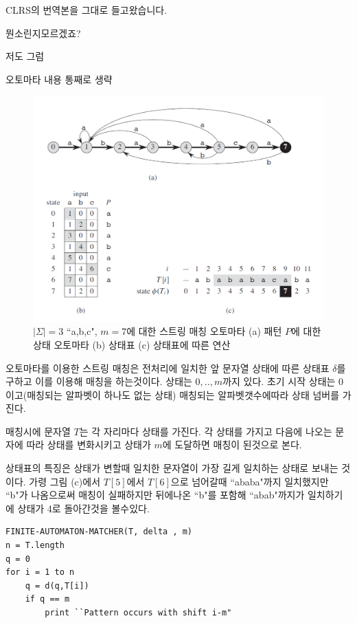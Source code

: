 CLRS의 번역본을 그대로 들고왔습니다.


뭔소린지모르겠죠?

저도 그럼

오토마타 내용 통째로 생략

\newpage



\begin{figure}[h!]
    \centering
    \includegraphics[scale=0.4]{pic2.PNG}
    \caption{$|\Sigma|  = 3$ ``a,b,c", $m = 7$에 대한 스트링 매칭 오토마타
    (a) 패턴 $P$에 대한 상태 오토마타 (b) 상태표 (c) 상태표에 따른 연산}
\end{figure}

오토마타를 이용한 스트링 매칭은 전처리에 일치한 앞 문자열 상태에 따른 상태표 $\delta$를 구하고 이를 이용해 매칭을 하는것이다.
상태는 $0,..,m$까지 있다. 초기 시작 상태는 0이고(매칭되는 알파벳이 하나도 없는 상태)
매칭되는 알파벳갯수에따라 상태 넘버를 가진다.

매칭시에 문자열 $T$는 각 자리마다 상태를 가진다. 각 상태를 가지고 다음에 나오는 문자에 따라 상태를 변화시키고 상태가 $m$에 도달하면 매칭이 된것으로 본다.

상태표의 특징은 상태가 변할때 일치한 문자열이 가장 길게 일치하는 상태로 보내는 것이다.
가령 그림 (c)에서 $T[5]$에서 $T[6]$으로 넘어갈때 ``ababa"까지 일치했지만 ``b"가 나옴으로써 매칭이 실패하지만 뒤에나온 ``b"를 포함해 ``abab"까지가 일치하기에 상태가 4로 돌아간것을 볼수있다.

\begin{lstlisting}[style = CStyle]
FINITE-AUTOMATON-MATCHER(T, delta , m)
n = T.length
q = 0 
for i = 1 to n
    q = d(q,T[i])
    if q == m
        print ``Pattern occurs with shift i-m"
\end{lstlisting}


